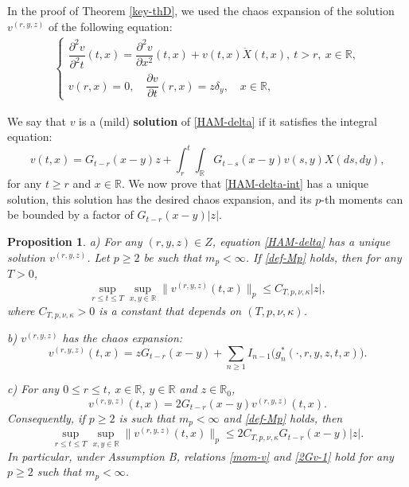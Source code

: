 \documentclass[12pt]{article}
\newtheorem{proposition}[theorem]{Proposition}
\def\bR{\mathbb{R}}
\def\k{\kappa}
\begin{document}
In the proof of Theorem \ref{key-thD}, we used the chaos expansion of the solution $v^{(r,y,z)}$ of the following equation:
\begin{align}
\label{HAM-delta}
	\begin{cases}
		\dfrac{\partial^2 v}{\partial^2 t} (t,x)
		=  \dfrac{\partial^2 v}{\partial x^2} (t,x)+v(t,x) \dot{X}(t,x), \
		t>r, \ x \in \bR, \\
		v(r,x) = 0, \quad \dfrac{\partial v}{\partial t} (r,x)=z\delta_y, \quad x \in \bR,
	\end{cases}
\end{align}

We say that $v$ is a (mild) {\bf solution} of \eqref{HAM-delta} if it satisfies the integral equation:
\begin{equation}
\label{HAM-delta-int}
v(t,x)=G_{t-r}(x-y)z+\int_r^t \int_{\bR}G_{t-s}(x-y)v(s,y)X(ds,dy),
\end{equation}
for any $t \geq r$ and $x \in \bR$.
We now prove that \eqref{HAM-delta-int} has a unique solution, this solution has the desired chaos expansion, and its $p$-th moments can be bounded by a factor of $G_{t-r}(x-y)|z|$.

\begin{proposition}
\label{properties-v}
a) For any $(r,y,z)\in Z$, equation \eqref{HAM-delta} has a unique solution $v^{(r,y,z)}$. Let $p\geq 2$ be such that $m_p<\infty$. If \eqref{def-Mp} holds, then for any $T>0$,
\begin{equation}
\label{mom-v}
\sup_{r\leq t\leq T}\sup_{x,y\in \bR}\|v^{(r,y,z)}(t,x)\|_p \leq C_{T,p,\nu,\k}|z|,
\end{equation}
where $C_{T,p,\nu,\k}>0$ is a constant that depends on $(T,p,\nu,\k)$. 


b) $v^{(r,y,z)}$ has the chaos expansion:
\begin{equation}
\label{chaos-v}
v^{(r,y,z)}(t,x)=zG_{t-r}(x-y)+\sum_{n\geq 1} I_{n-1}\big(g_n^*(\cdot,r,y,z,t,x) \big).
\end{equation}

c) For any $0\leq r\leq t$, $x \in \bR$, $y \in \bR$ and $z \in \bR_0$,
\begin{equation}
\label{2Gv}
v^{(r,y,z)}(t,x)=2G_{t-r}(x-y)v^{(r,y,z)}(t,x).
\end{equation}
Consequently, if $p\geq 2$ is such that $m_p<\infty$ and \eqref{def-Mp} holds, then %
\begin{equation}
\label{2Gv-1}
\sup_{r\leq t\leq T}\sup_{x,y\in \bR}\|v^{(r,y,z)}(t,x)\|_p \leq 2C_{T,p,\nu,\k}G_{t-r}(x-y)|z|.
\end{equation}
In particular, under Assumption B, relations \eqref{mom-v} and \eqref{2Gv-1} hold for any $p\geq 2$ such that $m_p<\infty$.
\end{proposition}
\end{document}
